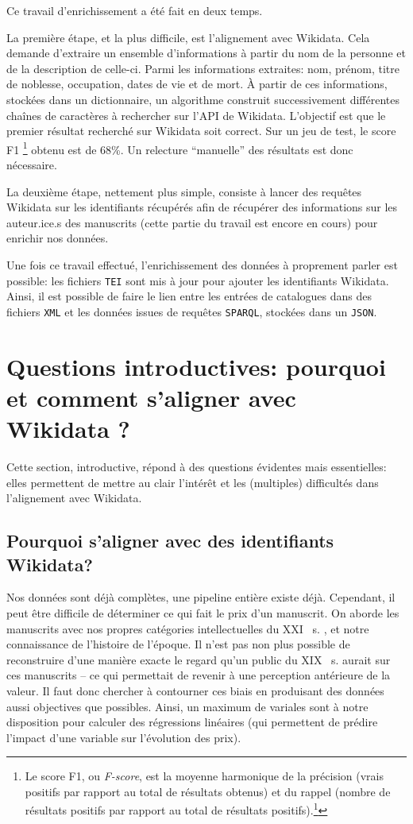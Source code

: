\documentclass[a4paper, 12pt, twoside]{book}
\newcommand{\siecle}[1]{%
	#1%
	\ifthenelse{\equal{#1}{I}}{\up{er}}{\up{ème}}%
	~s.%
}
\newcommand{\json}{\texttt{JSON}}
\newcommand{\sparql}{\texttt{SPARQL}}
\newcommand{\tei}{\texttt{TEI}}
\newcommand{\xml}{\texttt{XML}}
\begin{document}
Ce travail d'enrichissement a été fait en deux temps. 

La première étape, et la plus difficile, est l'alignement avec Wikidata. Cela demande d'extraire un ensemble d'informations à partir du nom de la personne et de la description de celle-ci. Parmi les informations extraites: nom, prénom, titre de noblesse, occupation, dates de vie et de mort. À partir de ces informations, stockées dans un dictionnaire, un algorithme construit successivement différentes chaînes de caractères à rechercher sur l'API de Wikidata. L'objectif est que le premier résultat recherché sur Wikidata soit correct. Sur un jeu de test, le score F1 \footnote{Le score F1, ou \textit{F-score}, est la moyenne harmonique de la précision (vrais positifs par rapport au total de résultats obtenus) et du rappel (nombre de résultats positifs par rapport au total de résultats positifs).\footcite{noauthor_precision_2022}} obtenu est de 68\%. Un relecture \enquote{manuelle} des résultats est donc nécessaire.

La deuxième étape, nettement plus simple, consiste à lancer des requêtes Wikidata sur les identifiants récupérés afin de récupérer des informations sur les auteur.ice.s des manuscrits (cette partie du travail est encore en cours) pour enrichir nos données.

Une fois ce travail effectué, l'enrichissement des données à proprement parler est possible: les fichiers \tei{} sont mis à jour pour ajouter les identifiants Wikidata. Ainsi, il est possible de faire le lien entre les entrées de catalogues dans des fichiers \xml{} et les données issues de requêtes \sparql{}, stockées dans un \json.


\section{Questions introductives: pourquoi et comment s'aligner avec Wikidata ?}
Cette section, introductive, répond à des questions évidentes mais essentielles: elles permettent de mettre au clair l'intérêt et les (multiples) difficultés dans l'alignement avec Wikidata.

\subsection{Pourquoi s'aligner avec des identifiants Wikidata?} 
Nos données sont déjà complètes, une pipeline entière existe déjà. Cependant, il peut être difficile de déterminer ce qui fait le prix d'un manuscrit. On aborde les manuscrits avec nos propres catégories intellectuelles du \siecle{XXI}, et notre connaissance de l'histoire de l'époque. Il n'est pas non plus possible de reconstruire d'une manière exacte le regard qu'un public du \siecle{XIX} aurait sur ces manuscrits -- ce qui permettait de revenir à une perception antérieure de la valeur. Il faut donc chercher à contourner ces biais en produisant des données aussi objectives que possibles. Ainsi, un maximum de variales sont à notre disposition pour calculer des régressions linéaires (qui permettent de prédire l'impact d'une variable sur l'évolution des prix).
\end{document}
